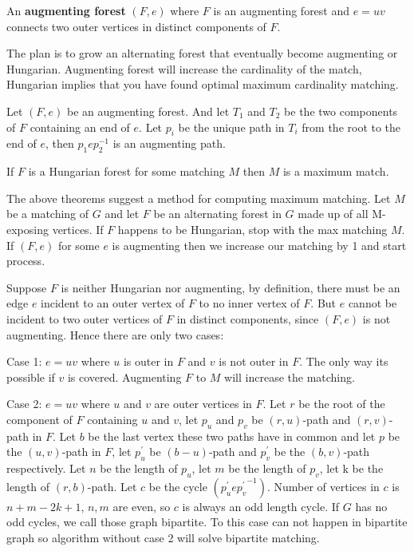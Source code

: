 			\begin{definition}
				An \textbf{augmenting forest} $(F, e)$ where $F$ is an augmenting forest and $e = uv$ connects two outer vertices in distinct components of $F$.
			\end{definition}

			The plan is to grow an alternating forest that eventually become augmenting or Hungarian. Augmenting forest will increase the cardinality of the match, Hungarian implies that you have found optimal maximum cardinality matching.

			\begin{theorem}
				Let $(F, e)$ be an augmenting forest. And let $T_1$ and $T_2$ be the two components of $F$ containing an end of $e$. Let $p_i$ be the unique path in $T_i$ from the root to the end of $e$, then $p_1ep_2^{-1}$ is an augmenting path.
			\end{theorem}

			\begin{theorem}
				If $F$ is a Hungarian forest for some matching $M$ then $M$ is a maximum match.
			\end{theorem}

			The above theorems suggest a method for computing maximum matching. Let $M$ be a matching of $G$ and let $F$ be an alternating forest in $G$ made up of all M-exposing vertices. If $F$ happens to be Hungarian, stop with the max matching $M$. If $(F, e)$ for some $e$ is augmenting then we increase our matching by 1 and start process.

			Suppose $F$ is neither Hungarian nor augmenting, by definition, there must be an edge $e$ incident to an outer vertex of $F$ to no inner vertex of $F$. But $e$ cannot be incident to two outer vertices of $F$ in distinct components, since $(F, e)$ is not augmenting. Hence there are only two cases:

			Case 1: $e=uv$ where $u$ is outer in $F$ and $v$ is not outer in $F$. The only way its possible if $v$ is covered. Augmenting $F$ to $M$ will increase the matching. 

			Case 2: $e=uv$ where $u$ and $v$ are outer vertices in $F$. Let $r$ be the root of the component of $F$ containing $u$ and $v$, let $p_u$ and $p_v$ be $(r,u)$-path and $(r, v)$-path in $F$. Let $b$ be the last vertex these two paths have in common and let $p$ be the $(u, v)$-path in $F$, let $p_u^\prime$ be $(b-u)$-path and $p_v^\prime$ be the $(b,v)$-path respectively. Let $n$ be the length of $p_u$, let $m$ be the length of $p_v$, let k be the length of $(r, b)$-path. Let $c$ be the cycle $(p_u^\prime e {p_v^{\prime}}^{-1})$. Number of vertices in $c$ is $n + m-2k + 1$, $n, m$ are even, so $c$ is always an odd length cycle. If $G$ has no odd cycles, we call those graph bipartite. To this case can not happen in bipartite graph so algorithm without case 2 will solve bipartite matching.

